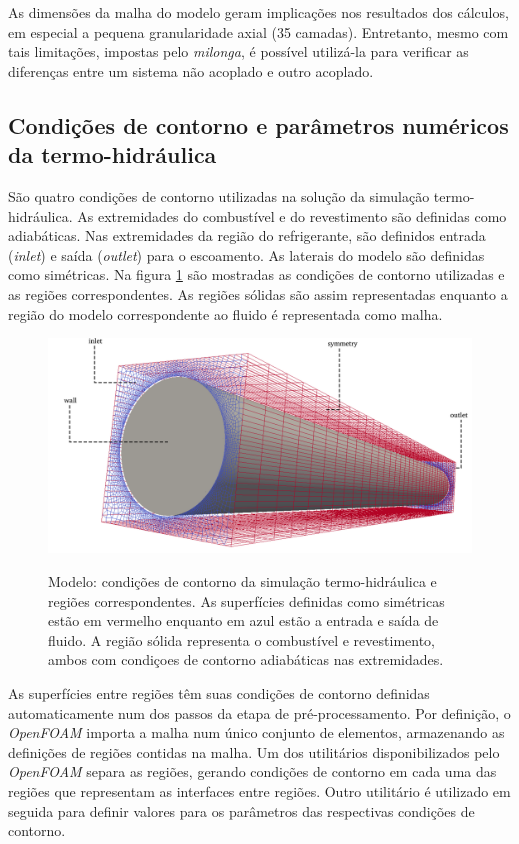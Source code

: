 As dimensões da malha do modelo geram implicações nos resultados dos cálculos, em
especial a pequena granularidade axial (35 camadas). Entretanto, mesmo com tais
limitações, impostas pelo \textit{milonga}, é possível utilizá-la para verificar
as diferenças entre um sistema não acoplado e outro acoplado.


\subsection{Condições de contorno e parâmetros numéricos da termo-hidráulica}
\label{subsec:ccth}

São quatro condições de contorno utilizadas na solução da simulação termo-hidráulica.
As extremidades do combustível e do revestimento são definidas como adiabáticas. Nas
extremidades da região do refrigerante, são definidos entrada (\textit{inlet}) e
saída (\textit{outlet}) para o escoamento. As laterais do modelo são definidas
como simétricas. Na figura \ref{fig:ccth} são mostradas as condições de contorno
utilizadas e as regiões correspondentes. As regiões sólidas são assim representadas
enquanto a região do modelo correspondente ao fluido é representada como malha.

\begin{figure}[htb]
  \caption{Modelo: condições de contorno da simulação termo-hidráulica e regiões
    correspondentes. As superfícies definidas como simétricas estão em vermelho
    enquanto em azul estão a entrada e saída de fluido. A região sólida representa
    o combustível e revestimento, ambos com condiçoes de contorno adiabáticas nas
    extremidades.}
  \centering\includegraphics[scale=0.5]{figuras/inlet_paredes_extremos_wireframe2.png}
  \label{fig:ccth}
\end{figure}

As superfícies entre regiões têm suas condições de contorno definidas automaticamente
num dos passos da etapa de pré-processamento. Por definição, o \textit{OpenFOAM} importa
a malha num único conjunto de elementos, armazenando as definições de regiões
contidas na malha. Um dos utilitários disponibilizados pelo \textit{OpenFOAM} separa
as regiões, gerando condições de contorno em cada uma das regiões que representam
as interfaces entre regiões. Outro utilitário é utilizado em seguida para definir valores
para os parâmetros das respectivas condições de contorno.


